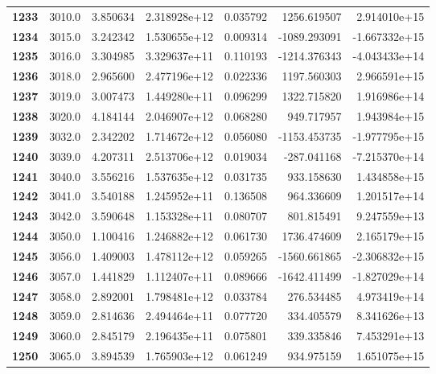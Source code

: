 \documentclass{report}[12pt]
\begin{document}
\begin{center}
\begin{tabular}{lrrrrrr}
\textbf{1233} &         3010.0 &   3.850634 &  2.318928e+12 &    0.035792 &  1256.619507 &  2.914010e+15 \\
\textbf{1234} &         3015.0 &   3.242342 &  1.530655e+12 &    0.009314 & -1089.293091 & -1.667332e+15 \\
\textbf{1235} &         3016.0 &   3.304985 &  3.329637e+11 &    0.110193 & -1214.376343 & -4.043433e+14 \\
\textbf{1236} &         3018.0 &   2.965600 &  2.477196e+12 &    0.022336 &  1197.560303 &  2.966591e+15 \\
\textbf{1237} &         3019.0 &   3.007473 &  1.449280e+11 &    0.096299 &  1322.715820 &  1.916986e+14 \\
\textbf{1238} &         3020.0 &   4.184144 &  2.046907e+12 &    0.068280 &   949.717957 &  1.943984e+15 \\
\textbf{1239} &         3032.0 &   2.342202 &  1.714672e+12 &    0.056080 & -1153.453735 & -1.977795e+15 \\
\textbf{1240} &         3039.0 &   4.207311 &  2.513706e+12 &    0.019034 &  -287.041168 & -7.215370e+14 \\
\textbf{1241} &         3040.0 &   3.556216 &  1.537635e+12 &    0.031735 &   933.158630 &  1.434858e+15 \\
\textbf{1242} &         3041.0 &   3.540188 &  1.245952e+11 &    0.136508 &   964.336609 &  1.201517e+14 \\
\textbf{1243} &         3042.0 &   3.590648 &  1.153328e+11 &    0.080707 &   801.815491 &  9.247559e+13 \\
\textbf{1244} &         3050.0 &   1.100416 &  1.246882e+12 &    0.061730 &  1736.474609 &  2.165179e+15 \\
\textbf{1245} &         3056.0 &   1.409003 &  1.478112e+12 &    0.059265 & -1560.661865 & -2.306832e+15 \\
\textbf{1246} &         3057.0 &   1.441829 &  1.112407e+11 &    0.089666 & -1642.411499 & -1.827029e+14 \\
\textbf{1247} &         3058.0 &   2.892001 &  1.798481e+12 &    0.033784 &   276.534485 &  4.973419e+14 \\
\textbf{1248} &         3059.0 &   2.814636 &  2.494464e+11 &    0.077720 &   334.405579 &  8.341626e+13 \\
\textbf{1249} &         3060.0 &   2.845179 &  2.196435e+11 &    0.075801 &   339.335846 &  7.453291e+13 \\
\textbf{1250} &         3065.0 &   3.894539 &  1.765903e+12 &    0.061249 &   934.975159 &  1.651075e+15 \\

\end{tabular}
\end{center}
\end{document}
